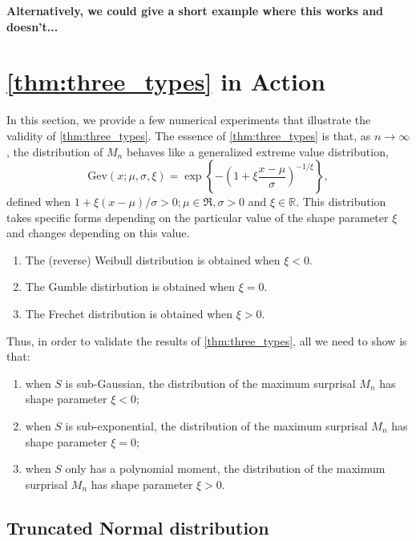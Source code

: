 \documentclass[a4paper,11pt]{article}
\begin{document}
\textbf{Alternatively, we could give a short example where this works and doesn't...}


\newpage


\section{\cref{thm:three_types} in Action}

In this section, we provide a few numerical experiments that illustrate the validity of \cref{thm:three_types}. The essence of \cref{thm:three_types} is that, as $n\rightarrow\infty$, the distribution of $M_n$ behaves like a generalized extreme value distribution,
$$
	\mathrm{Gev}(x;\mu,\sigma,\xi)=\exp \left\{-\left(1+\xi \frac{x-\mu}{\sigma}\right)^{-1 / \xi}\right\},
$$
defined when $1+\xi(x-\mu) / \sigma>0 ; \mu \in \Re, \sigma>0$ and $\xi \in \mathbb{R}$. This distribution takes specific forms depending on the particular value of the shape parameter $\xi$ and changes depending on this value.
\begin{enumerate}
	\item The (reverse) Weibull distribution is obtained when $\xi<0$.
	\item The Gumble distirbution is obtained when $\xi=0$.
	\item The Frechet distribution is obtained when $\xi>0$.
\end{enumerate}
Thus, in order to validate the results of \cref{thm:three_types}, all we need to show is that:
\begin{enumerate}
	\item when $S$ is sub-Gaussian, the distribution of the maximum surprisal $M_n$ has shape parameter $\xi<0$;
	\item when $S$ is sub-exponential, the distribution of the maximum surprisal $M_n$ has shape parameter $\xi=0$;
	\item when $S$ only has a polynomial moment, the distribution of the maximum surprisal $M_n$ has shape parameter $\xi>0$.
\end{enumerate}

\subsection{Truncated Normal distribution}
\end{document}

